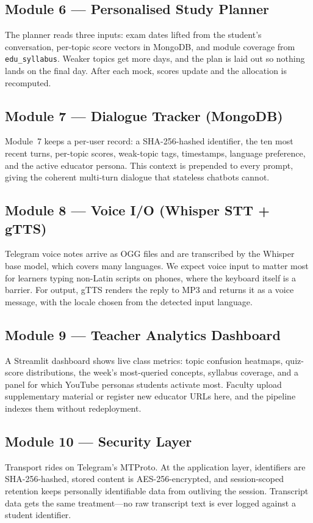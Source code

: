 \documentclass[conference]{IEEEtran}
\begin{document}
\subsection{Module 6 --- Personalised Study Planner}
The planner reads three inputs: exam dates lifted from the student's
conversation, per-topic score vectors in MongoDB, and module coverage
from \texttt{edu\_syllabus}. Weaker topics get more days, and the plan
is laid out so nothing lands on the final day. After each mock, scores
update and the allocation is recomputed.
\subsection{Module 7 --- Dialogue Tracker (MongoDB)}
Module~7 keeps a per-user record: a SHA-256-hashed identifier, the ten
most recent turns, per-topic scores, weak-topic tags, timestamps,
language preference, and the active educator persona. This context is
prepended to every prompt, giving the coherent multi-turn dialogue that
stateless chatbots cannot.
\subsection{Module 8 --- Voice I/O (Whisper STT + gTTS)}
Telegram voice notes arrive as OGG files and are transcribed by the
Whisper base model, which covers many languages. We expect voice input
to matter most for learners typing non-Latin scripts on phones, where
the keyboard itself is a barrier. For output, gTTS renders the reply to
MP3 and returns it as a voice message, with the locale chosen from the
detected input language.
\subsection{Module 9 --- Teacher Analytics Dashboard}
A Streamlit dashboard shows live class metrics: topic confusion
heatmaps, quiz-score distributions, the week's most-queried concepts,
syllabus coverage, and a panel for which YouTube personas students
activate most. Faculty upload supplementary material or register new
educator URLs here, and the pipeline indexes them without redeployment.
\subsection{Module 10 --- Security Layer}
Transport rides on Telegram's MTProto. At the application layer,
identifiers are SHA-256-hashed, stored content is AES-256-encrypted,
and session-scoped retention keeps personally identifiable data from
outliving the session. Transcript data gets the same treatment---no raw
transcript text is ever logged against a student identifier.
\end{document}
